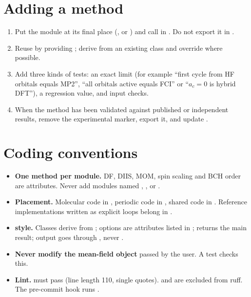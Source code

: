 \section{Adding a method}

\begin{enumerate}
  \item Put the module at its final place (,  or
        ) and call 
        in . Do not export it in .
  \item Reuse  by providing
        ; derive from an existing
        class and override  where possible.
  \item Add three kinds of tests: an exact limit (for example ``first cycle
        from HF orbitals equals \pyscf{} MP2'', ``all orbitals active equals
        FCI'' or ``$a_c=0$ is hybrid DFT''), a regression value, and input
        checks.
  \item When the method has been validated against published or independent
        results, remove the experimental marker, export it, and update
        .
\end{enumerate}

\section{Coding conventions}

\begin{itemize}
  \item \textbf{One method per module.} DF, DIIS, MOM, spin scaling and BCH
        order are attributes. Never add modules named ,
        ,  or .
  \item \textbf{Placement.} Molecular code in , periodic code in
        , shared code in . Reference implementations
        written as explicit loops belong in .
  \item \textbf{\pyscf{} style.} Classes derive from
        ; options are attributes listed in
        ;  returns the main result; output goes
        through , never .
  \item \textbf{Never modify the mean-field object} passed by the user. A test
        checks this.
  \item \textbf{Lint.}  must pass
        (line length 110, single quotes).  and
         are excluded from ruff. The pre-commit hook runs
        .
\end{itemize}

